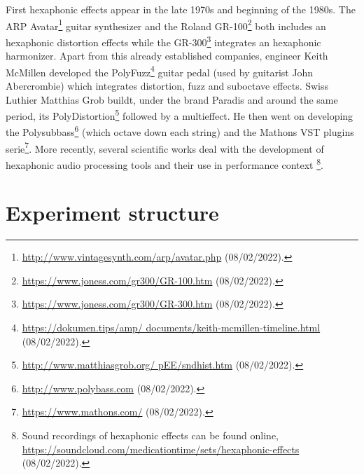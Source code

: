 \documentclass{article}
\begin{document}
First hexaphonic effects appear in the late 1970s and beginning of the 1980s. The ARP Avatar\footnote{\url{http://www.vintagesynth.com/arp/avatar.php} (08/02/2022).} guitar synthesizer and the Roland GR-100\footnote{\url{https://www.joness.com/gr300/GR-100.htm} (08/02/2022).} both includes an hexaphonic distortion effects while the GR-300\footnote{\url{https://www.joness.com/gr300/GR-300.htm} (08/02/2022).} integrates an hexaphonic harmonizer. Apart from this already established companies, engineer Keith McMillen developed the PolyFuzz\footnote{\url{https://dokumen.tips/amp/
documents/keith-mcmillen-timeline.html} (08/02/2022).} guitar pedal (used by guitarist John Abercrombie) which integrates distortion, fuzz and suboctave effects. Swiss Luthier Matthias Grob buildt, under the brand Paradis and around the same period, its PolyDistortion\footnote{\url{http://www.matthiasgrob.org/
pEE/sndhist.htm} (08/02/2022).} followed by a multieffect. He then went on developing the Polysubbass\footnote{\url{http://www.polybass.com} (08/02/2022).} (which octave down each string) and the Mathons VST plugins serie\footnote{\url{https://www.mathons.com/} (08/02/2022).}.
More recently, several scientific works deal with the development of hexaphonic audio processing tools \cite{sci:Puckette2007} and their use in performance context \cite{Reboursiere2020_Puzzle_eng,sci:Graham2012, Bates2009}\footnote{Sound recordings of hexaphonic effects can be found online, \url{https://soundcloud.com/medicationtime/sets/hexaphonic-effects} (08/02/2022).}.



\section{Experiment structure}\label{sec:exp_structure}
\end{document}
